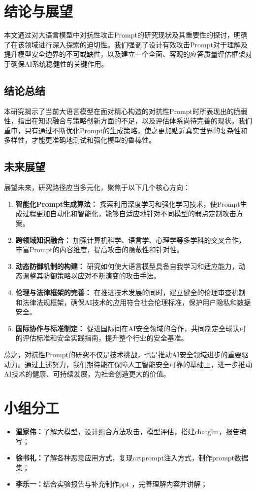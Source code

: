 \documentclass{article} %
\begin{document}
\section{结论与展望}

本文通过对大语言模型中对抗性攻击Prompt的研究现状及其重要性的探讨，明确了在该领域进行深入探索的迫切性。我们强调了设计有效攻击Prompt对于理解及提升模型安全边界的不可或缺性，以及建立一个全面、客观的应答质量评估框架对于确保AI系统稳健性的关键作用。

\subsection{结论总结}
本研究揭示了当前大语言模型在面对精心构造的对抗性Prompt时所表现出的脆弱性，指出在知识融合与策略创新方面的不足，以及评估体系尚待完善的现状。我们重申，只有通过不断优化Prompt的生成策略，使之更加贴近真实世界的复杂性和多样性，才能更准确地测试和强化模型的鲁棒性。

\subsection{未来展望}
展望未来，研究路径应当多元化，聚焦于以下几个核心方向：
\begin{enumerate}[label=\alph*)]
    \item \textbf{智能化Prompt生成算法：} 探索利用深度学习和强化学习技术，使Prompt生成过程更加自动化和智能化，能够自适应地针对不同模型的弱点定制攻击方案。
    
    \item \textbf{跨领域知识融合：} 加强计算机科学、语言学、心理学等多学科的交叉合作，丰富Prompt的内容维度，提高攻击的隐蔽性和针对性。
    
    \item \textbf{动态防御机制的构建：} 研究如何使大语言模型具备自我学习和适应能力，动态调整其防御策略以应对不断演变的攻击手法。
    
    \item \textbf{伦理与法律框架的完善：} 在推进技术发展的同时，建立健全的伦理审查机制和法律法规框架，确保AI技术的应用符合社会伦理标准，保护用户隐私和数据安全。
    
    \item \textbf{国际协作与标准制定：} 促进国际间在AI安全领域的合作，共同制定全球认可的评估标准和安全实践指南，提升整个行业的安全基准。
\end{enumerate}

总之，对抗性Prompt的研究不仅是技术挑战，也是推动AI安全领域进步的重要驱动力。通过上述努力，我们期待能在保障人工智能安全可靠的基础上，进一步推动AI技术的健康、可持续发展，为社会创造更大的价值。

\section{小组分工}
\begin{itemize}
    \item \textbf{温家伟：}了解大模型，设计组合方法攻击，模型评估，搭建chatglm，报告编写；
    \item \textbf{徐书礼：}了解各种恶意应用方式，复现artprompt注入方式，制作prompt数据集；
    \item \textbf{李乐一：}结合实验报告与补充制作ppt ，完善理解内容并讲解；
\end{itemize}
\end{document}
